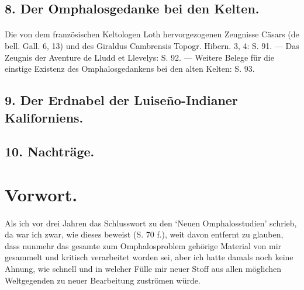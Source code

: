 \documentclass[a4paper, 11pt, oneside]{article}
\begin{document}
\subsection*{8. Der Omphalosgedanke bei den Kelten.}
\paragraph{}
Die von dem französischen Keltologen Loth hervorgezogenen Zeugnisse Cäsars (de bell. Gall. 6, 13) und des Giraldus Cambrensis Topogr. Hibern. 3, 4: S. 91. --- Das Zeugnis der Aventure de Lludd et Llevelys: S. 92. --- Weitere Belege für die einstige Existenz des Omphalosgedankens bei den alten Kelten: S. 93.

\subsection*{9. Der Erdnabel der Luiseño-Indianer Kaliforniens.}
\subsection*{10. Nachträge.}
\clearpage
\section*{Vorwort.}
\paragraph{}
Als ich vor drei Jahren das Schlusswort zu den `Neuen Omphalosstudien' schrieb, da war ich zwar, wie dieses beweist (S. 70 f.), weit davon entfernt zu glauben, dass nunmehr das gesamte zum Omphalosproblem gehörige Material von mir gesammelt und kritisch verarbeitet worden sei, aber ich hatte damals noch keine Ahnung, wie schnell und in welcher Fülle mir neuer Stoff aus allen möglichen Weltgegenden zu neuer Bearbeitung zuströmen würde.
\end{document}

